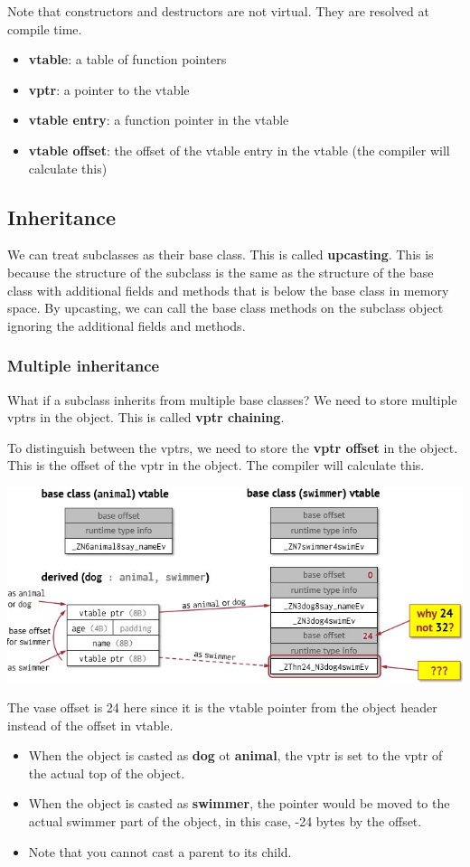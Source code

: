 \documentclass[letterpaper,12pt]{article}
\begin{document}
Note that constructors and destructors are not virtual. They are resolved at compile time.
\begin{itemize}
    \item \textbf{vtable}: a table of function pointers
    \item \textbf{vptr}: a pointer to the vtable
    \item \textbf{vtable entry}: a function pointer in the vtable
    \item \textbf{vtable offset}: the offset of the vtable entry in the vtable (the compiler will calculate this)
\end{itemize}
\subsection{Inheritance}
We can treat subclasses as their base class. This is called \textbf{upcasting}. This is because the structure of the subclass is the same as the structure of the base class with additional fields and methods that is below the base class in memory space. By upcasting, we can call the base class methods on the subclass object ignoring the additional fields and methods.
\subsubsection{Multiple inheritance}
What if a subclass inherits from multiple base classes? We need to store multiple vptrs in the object. This is called \textbf{vptr chaining}.

To distinguish between the vptrs, we need to store the \textbf{vptr offset} in the object. This is the offset of the vptr in the object. The compiler will calculate this.

\includegraphics*[scale = 0.7]{./Images/Mutiple inheritance.jpg}

The vase offset is 24 here since it is the vtable pointer from the object header instead of the offset in vtable. \begin{itemize}
    \item When the object is casted as \textbf{dog} ot \textbf{animal}, the vptr is set to the vptr of the actual top of the object.
    \item When the object is casted as \textbf{swimmer}, the pointer would be moved to the actual swimmer part of the object, in this case, -24 bytes by the offset. 
    \item Note that you cannot cast a parent to its child.
\end{itemize}
\end{document}
